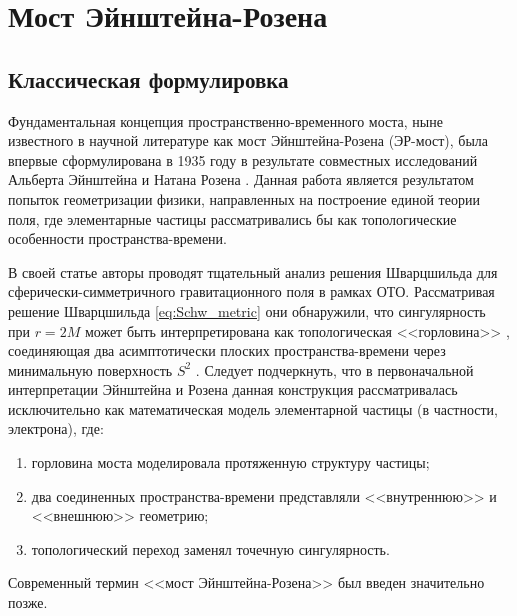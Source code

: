 \chapter{Мост Эйнштейна-Розена}\label{ch:2}

\section{Классическая формулировка}\label{sec:2.1}
Фундаментальная концепция пространственно-временного моста, ныне известного в научной литературе как мост Эйнштейна-Розена (ЭР-мост), была впервые сформулирована в 1935 году в результате совместных исследований Альберта Эйнштейна и Натана Розена \cite{einsteinParticleProblemGeneral1935}. Данная работа является результатом попыток геометризации физики, направленных на построение единой теории поля, где элементарные частицы рассматривались бы как топологические особенности пространства-времени.

В своей статье авторы проводят тщательный анализ решения Шварцшильда для сферически-симметричного гравитационного поля в рамках ОТО. Рассматривая решение Шварцшильда \cref{eq:Schw_metric} они обнаружили, что сингулярность при \(r = 2M\) может быть интерпретирована как топологическая <<горловина>> , соединяющая два асимптотически плоских пространства-времени через минимальную поверхность \(S^2\) \cite{ellisEtherFlowDrainhole1973}.
Следует подчеркнуть, что в первоначальной интерпретации Эйнштейна и Розена данная конструкция рассматривалась исключительно как математическая модель элементарной частицы (в частности, электрона), где:
\begin{enumerate}[beginpenalty=10000]
	\item горловина моста моделировала протяженную структуру частицы;
	\item два соединенных пространства-времени представляли <<внутреннюю>> и <<внешнюю>> геометрию;
	\item топологический переход заменял точечную сингулярность.
\end{enumerate}
Современный термин <<мост Эйнштейна-Розена>> был введен значительно позже.

